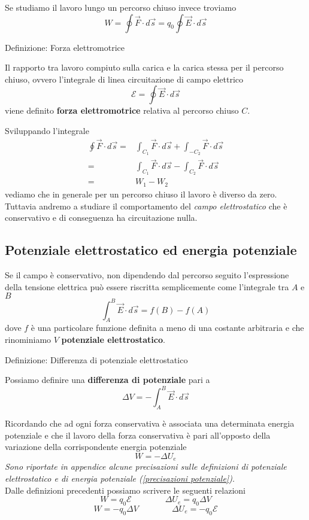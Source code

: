 \documentclass[x11names]{report}
\newcommand{\definizione}[2]{
	\begin{center}
		\fboxsep11pt
		\colorbox{myblue}{\begin{minipage}{5.75in}
				\begin{blues}{Definizione: #1}
					#2
				\end{blues}
		\end{minipage}}
	\end{center}
}
\begin{document}
Se studiamo il lavoro lungo un percorso chiuso invece troviamo
\[
W = \oint \vec{F} \cdot d\vec{s} = q_0\oint\vec{E}\cdot d\vec{s}
\]
\definizione{Forza elettromotrice}{
Il rapporto tra lavoro compiuto sulla carica e la carica stessa per il percorso chiuso, ovvero l'integrale di linea circuitazione di campo elettrico
\begin{equation}
\mathcal{E} = \oint\vec{E}\cdot d\vec{s}
\end{equation}
viene definito \textbf{forza elettromotrice} relativa al percorso chiuso \(C\).
}
Sviluppando l'integrale
\begin{align*}
	\oint\vec{F}\cdot d\vec{s} =& \int_{C_1}\vec{F}\cdot d\vec{s} + \int_{-C_2}\vec{F}\cdot d\vec{s} \\
							   =& \int_{C_1}\vec{F}\cdot d\vec{s} - \int_{C_2}\vec{F}\cdot d\vec{s} \\
							   =& W_1 - W_2
\end{align*}
vediamo che in generale per un percorso chiuso il lavoro è diverso da zero. Tuttavia andremo a studiare il comportamento del \textit{campo elettrostatico} che è conservativo e di conseguenza ha circuitazione nulla. 


\subsection{Potenziale elettrostatico ed energia potenziale}
Se il campo è conservativo, non dipendendo dal percorso  seguito l'espressione della tensione elettrica può essere riscritta semplicemente come l'integrale tra \(A\) e \(B\) 
\[
\int_{A}^B\vec{E}\cdot d\vec{s} = f(B) - f(A)
\]
dove \(f\) è una particolare funzione definita a meno di una costante arbitraria e che rinominiamo \(V\) \textbf{potenziale elettrostatico}. 
\definizione{Differenza di potenziale elettrostatico}{
Possiamo definire una \textbf{differenza di potenziale} pari a 
\begin{equation}
\Delta V = - \int_{A}^B\vec{E}\cdot d\vec{s} 
\end{equation}
}
Ricordando che ad ogni forza conservativa è associata una determinata energia potenziale e che il lavoro della forza conservativa è pari all'opposto della variazione della corrispondente energia potenziale
\[
W = -\Delta U_e
\]
\textit{Sono riportate in appendice alcune precisazioni sulle definizioni di potenziale elettrostatico e di energia potenziale (\ref{precisazioni potenziale})}. \\


\noindent
Dalle definizioni precedenti possiamo scrivere le seguenti relazioni
\[
W = q_0 \mathcal{E}  \qquad\qquad \Delta U_e = q_0 \Delta V
\]
\[
W = -q_0 \Delta V \qquad\qquad  \Delta U_e = - q_0 \mathcal{E}
\]
\end{document}

